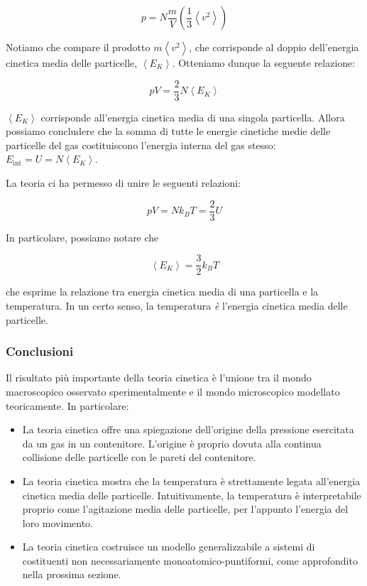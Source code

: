 \[ p = N\frac{m}{V}\left(\frac13 \left\langle v^2 \right\rangle\right) \]

\noindent Notiamo che compare il prodotto $m\left\langle v^2 \right\rangle$, che
corrisponde al doppio dell'energia cinetica media delle particelle,
$\left\langle E_K \right\rangle$. Otteniamo dunque la seguente relazione:

\[ pV = \frac23 N\left\langle E_K \right\rangle \]

\noindent $\left\langle E_K \right\rangle$ corrisponde all'energia cinetica media
di una singola particella.
Allora possiamo concludere che la somma di tutte le energie cinetiche
medie delle particelle del gas costituiscono l'energia interna del
gas stesso: $E_\text{int} = U = N\left\langle E_K \right\rangle$.

La teoria ci ha permesso di unire le seguenti relazioni:

\[ pV = Nk_BT = \frac23 U \]

\noindent In particolare, possiamo notare che

\[ \left\langle E_K \right\rangle = \frac{3}{2}k_B T \]

\noindent che esprime la relazione tra energia cinetica media di una
particella e la temperatura. In un certo senso, la temperatura \textit{è}
l'energia cinetica media delle particelle.

\subsubsection*{Conclusioni}
Il risultato più importante della teoria cinetica è l'unione tra
il mondo macroscopico osservato sperimentalmente e il mondo microscopico
modellato teoricamente. In particolare:
\begin{itemize}
    \item La teoria cinetica offre una spiegazione dell'origine della
    pressione esercitata da un gas in un contenitore. L'origine è proprio
    dovuta alla continua collisione delle particelle con le pareti
    del contenitore.

    \item La teoria cinetica mostra che la temperatura è strettamente
    legata all'energia cinetica media delle particelle. Intuitivamente,
    la temperatura è interpretabile proprio come l'agitazione media
    delle particelle, per l'appunto l'energia del loro movimento.

    \item La teoria cinetica costruisce un modello generalizzabile
    a sistemi di costituenti non necessariamente monoatomico-puntiformi,
    come approfondito nella prossima sezione.
\end{itemize}

